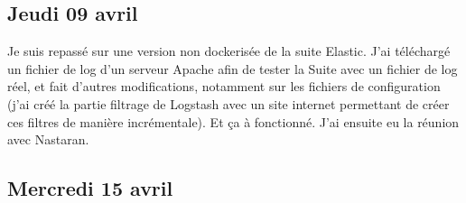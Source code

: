 \documentclass[paper=a4, fontsize=11pt]{scrartcl}
\begin{document}
\subsection{Jeudi 09 avril}
    Je suis repassé sur une version non dockerisée de la suite Elastic. J'ai téléchargé un fichier de log d'un serveur Apache afin de tester la Suite avec un fichier de log réel, et fait d'autres modifications, notamment sur les fichiers de configuration (j'ai créé la partie \og filtrage \fg de Logstash avec un site internet permettant de créer ces filtres de manière incrémentale). Et ça à fonctionné. J'ai ensuite eu la réunion avec Nastaran.
\subsection{Mercredi 15 avril}
    
\end{document}
